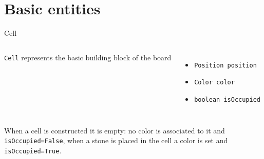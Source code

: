 \documentclass{beamer}
\begin{document}
\section{Basic entities}
\begin{frame}{Cell}

\begin{columns}
\texttt{Cell} represents the basic building block of the board 
\vspace{0.5cm}
\begin{itemize}
    \item \texttt{Position position }
    \item \texttt{Color color}
    \item \texttt{boolean isOccupied}
    

    
\end{itemize}

\end{columns}

\vspace{0.5cm}
When a cell is constructed it is empty: no color is associated to it and \texttt{isOccupied=False}, when a stone is placed in the cell a color is set and \texttt{isOccupied=True}.



\end{frame}
\end{document}
